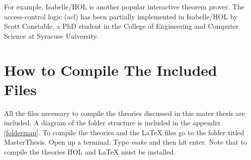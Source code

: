 \documentclass[../../main/main.tex]{subfiles}
\begin{document}
For example, Isabelle/HOL is another popular interactive theorem prover.  The access-control logic (\gls{acl}) has been partially implemented in Isabelle/HOL by Scott Constable, a PhD student in the College of Engineering and Computer Science at Syracuse University.  

\section{How to Compile The Included Files}
All the files necessary to compile the theories discussed in this mater thesis are included.  A diagram of the folder structure is included in the appendix \ref{foldermap}.  To compile the theories and the LaTeX files go to the folder titled MasterThesis.  Open up a terminal.  Type \emph{make} and then hit enter.  Note that to compile the theories HOL and LaTeX must be installed.  
\end{document}
